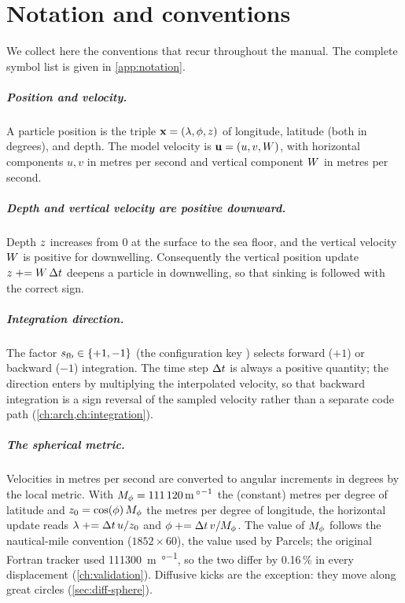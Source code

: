 \chapter*{Notation and conventions}

We collect here the conventions that recur throughout the manual. The complete
symbol list is given in \cref{app:notation}.

\paragraph{Position and velocity.} A particle position is the triple
$\mathbf{x}=(\lambda,\phi,z)$ of longitude, latitude (both in degrees), and depth.
The model velocity is $\mathbf{u}=(u,v,W)$, with horizontal components $u,v$ in
metres per second and vertical component $W$ in metres per second.

\paragraph{Depth and vertical velocity are positive downward.} Depth $z$
increases from $0$ at the surface to the sea floor, and the vertical velocity
$W$ is positive for downwelling. Consequently the vertical position update
$z \mathrel{+}= W\,\Delta t$ deepens a particle in downwelling, so that sinking
is followed with the correct sign.

\paragraph{Integration direction.} The factor $s_{\mathrm{fb}}\in\{+1,-1\}$ (the
configuration key ) selects forward ($+1$) or backward ($-1$)
integration. The time step $\Delta t$ is always a positive quantity; the direction
enters by multiplying the interpolated velocity, so that backward integration is
a sign reversal of the sampled velocity rather than a separate code path
(\cref{ch:arch,ch:integration}).

\paragraph{The spherical metric.} Velocities in metres per second are converted to
angular increments in degrees by the local metric. With
$M_{\phi}=\SI{111120}{\metre\per\degree}$ the (constant) metres per degree of
latitude and $z_{0}=\cos(\phi)\,M_{\phi}$ the metres per degree of longitude,
the horizontal update reads $\lambda \mathrel{+}= \Delta t\,u/z_{0}$ and
$\phi \mathrel{+}= \Delta t\,v/M_{\phi}$. The value of $M_{\phi}$ follows the nautical-mile
convention ($1852\times 60$), the value used by Parcels; the original Fortran tracker used
\SI{111300}{\metre\per\degree}, so the two differ by \num{0.16}\,\% in every displacement
(\cref{ch:validation}). Diffusive kicks are the exception: they move along great circles
(\cref{sec:diff-sphere}).


